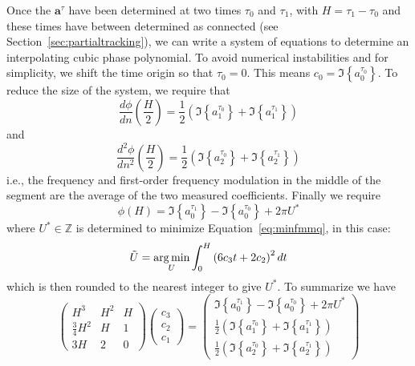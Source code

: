 Once the $\boldsymbol{a}^{\tau}$ have been determined
at two times $\tau_{0}$ and $\tau_{1}$, with $H = \tau_{1} - \tau_{0}$ and these
times have between determined as connected (see
Section~\ref{sec:partialtracking}), we can write a system of equations
to determine an interpolating cubic phase polynomial. To avoid numerical
instabilities and for simplicity, we shift the time origin so that $\tau_{0} =
0$. This means $c_0 = \Im \left\{ a^{\tau_0}_{0} \right\}$. To reduce the size
of the system, we require that 
\[
    \frac{d \phi}{d n} \left(\frac{H}{2} \right)
    =
    \frac{1}{2}
    \left( \Im \left\{ a^{\tau_0}_{1} \right\} + \Im \left\{ a^{\tau_1}_{1}
    \right\} \right)
\]
and
\[
    \frac{d^{2} \phi}{d n^{2}} \left(\frac{H}{2}
    \right)
    =
    \frac{1}{2} \left( \Im \left\{ a^{\tau_0}_{2} \right\} + \Im \left\{
    a^{\tau_1}_{2} \right\} \right)
\]
i.e., the frequency and first-order frequency modulation in the middle of the
segment are the average of the two measured coefficients. Finally we require
\[
    \phi \left( H \right)
    =
    \Im \left\{ a^{\tau_1}_{0} \right\} - \Im \left\{ a^{\tau_0}_{0} \right\}
    + 2 \pi U^{\ast}
\]
where $U^{\ast} \in \mathbb{Z}$ is determined to minimize
Equation~\ref{eq:minfmmq}, in this case:
\begin{equation}
    \label{eq:minfmcubic}
    \tilde{U} = \mathop{\rm arg\,min}_{U} \int_{0}^{H} \left(
    6 c_3 t + 2 c_2 \right)^{2} dt
\end{equation}
which is then rounded to the nearest integer to give $U^{\ast}$. To summarize we have
\begin{equation}
    \begin{pmatrix}
        H^{3} & H^{2} & H \\
        \frac{3}{4}H^{2} & H & 1 \\
        3 H & 2 & 0
    \end{pmatrix}
    \begin{pmatrix}
        c_{3} \\
        c_{2} \\
        c_{1}
    \end{pmatrix}
    =
    \begin{pmatrix}
        \Im \left\{ a^{\tau_1}_{0} \right\} - \Im \left\{ a^{\tau_0}_{0} \right\}
            + 2 \pi U^{\ast} \\
        \frac{1}{2}
        \left( \Im \left\{ a^{\tau_0}_{1} \right\} + \Im \left\{ a^{\tau_1}_{1}
        \right\} \right) \\
        \frac{1}{2} \left( \Im \left\{ a^{\tau_0}_{2} \right\} + \Im \left\{
        a^{\tau_1}_{2} \right\} \right)
    \end{pmatrix}
\end{equation}
